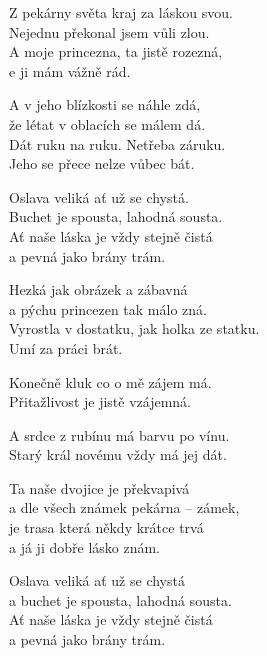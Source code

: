 
\ve{} 
Z pekárny světa kraj za láskou svou. \\
Nejednu překonal jsem vůli zlou. \\
A moje princezna, ta jistě rozezná, \\
e ji mám vážně rád.

\ve{}
A v jeho blízkosti se náhle zdá,\\
že létat v oblacích se málem dá.\\
Dát ruku na ruku. Netřeba záruku.\\
Jeho se přece nelze vůbec bát.

\cho{} 
Oslava veliká ať už se chystá.\\
Buchet je spousta, lahodná sousta.\\
Ať naše láska je vždy stejně čistá\\
a pevná jako brány trám.

\ve{}
Hezká jak obrázek a zábavná\\
a pýchu princezen tak málo zná.\\
Vyrostla v dostatku, jak holka ze statku.\\
Umí za práci brát.

\ve{} 
Konečně kluk co o mě zájem má.\\
Přitažlivost je jistě vzájemná.
 
A srdce z rubínu má barvu po vínu.\\
Starý král novému vždy má jej dát.

\cho{} 
Ta naše dvojice je překvapivá\\
a dle všech známek pekárna -- zámek,\\
je trasa která někdy krátce trvá\\
a já ji dobře lásko znám.

\re{}
Oslava veliká ať už se chystá\\
a buchet je spousta, lahodná sousta.\\
Ať naše láska je vždy stejně čistá\\
a pevná jako brány trám.

\esong{}